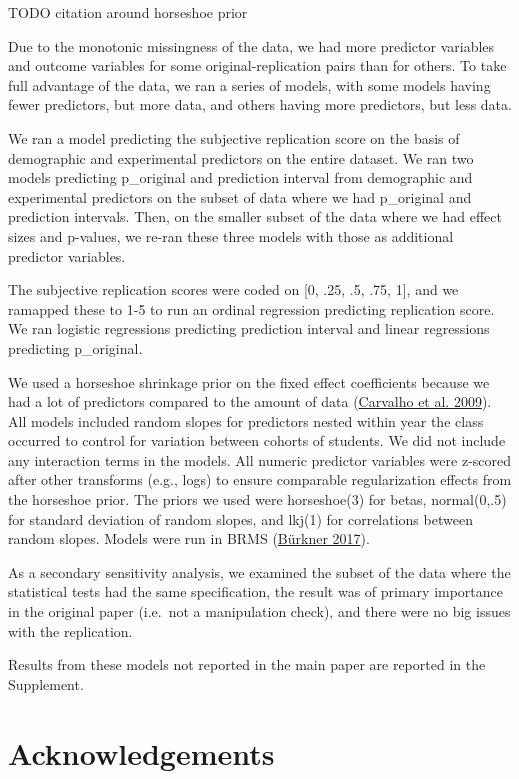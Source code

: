 \documentclass[
  english,
  a4paper,
]{article}
\begin{document}
TODO citation around horseshoe prior

Due to the monotonic missingness of the data, we had more predictor variables and outcome variables for some original-replication pairs than for others. To take full advantage of the data, we ran a series of models, with some models having fewer predictors, but more data, and others having more predictors, but less data.

We ran a model predicting the subjective replication score on the basis of demographic and experimental predictors on the entire dataset. We ran two models predicting p\_original and prediction interval from demographic and experimental predictors on the subset of data where we had p\_original and prediction intervals. Then, on the smaller subset of the data where we had effect sizes and p-values, we re-ran these three models with those as additional predictor variables.

The subjective replication scores were coded on {[}0, .25, .5, .75, 1{]}, and we ramapped these to 1-5 to run an ordinal regression predicting replication score. We ran logistic regressions predicting prediction interval and linear regressions predicting p\_original.

We used a horseshoe shrinkage prior on the fixed effect coefficients because we had a lot of predictors compared to the amount of data (\protect\hyperlink{ref-carvalho09}{Carvalho et al. 2009}). All models included random slopes for predictors nested within year the class occurred to control for variation between cohorts of students. We did not include any interaction terms in the models. All numeric predictor variables were z-scored after other transforms (e.g., logs) to ensure comparable regularization effects from the horseshoe prior. The priors we used were horseshoe(3) for betas, normal(0,.5) for standard deviation of random slopes, and lkj(1) for correlations between random slopes. Models were run in BRMS (\protect\hyperlink{ref-brms}{Bürkner 2017}).

As a secondary sensitivity analysis, we examined the subset of the data where the statistical tests had the same specification, the result was of primary importance in the original paper (i.e.~not a manipulation check), and there were no big issues with the replication.

Results from these models not reported in the main paper are reported in the Supplement.

\hypertarget{acknowledgements}{%
\section*{Acknowledgements}\label{acknowledgements}}
\end{document}

